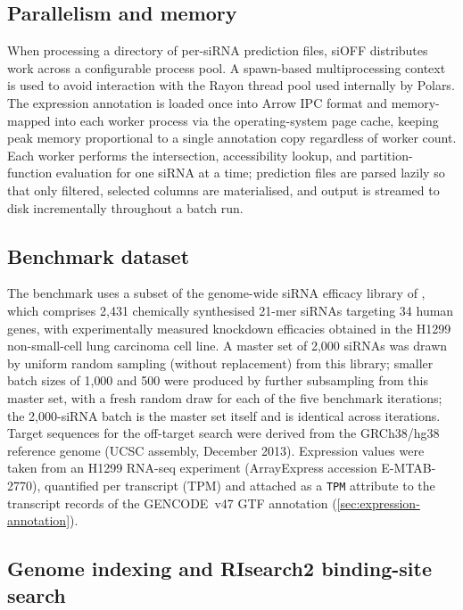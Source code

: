 \documentclass[11pt]{article}
\begin{document}
\subsection{Parallelism and memory}\label{sec:parallelism}

When processing a directory of per-siRNA prediction files, siOFF distributes work across a configurable process pool.
A spawn-based multiprocessing context is used to avoid interaction with the Rayon thread pool used internally by Polars.
The expression annotation is loaded once into Arrow IPC format and memory-mapped into each worker process via the operating-system page cache, keeping peak memory proportional to a single annotation copy regardless of worker count.
Each worker performs the intersection, accessibility lookup, and partition-function evaluation for one siRNA at a time; prediction files are parsed lazily so that only filtered, selected columns are materialised, and output is streamed to disk incrementally throughout a batch run.

\subsection{Benchmark dataset}\label{sec:benchmark-dataset}

The benchmark uses a subset of the genome-wide siRNA efficacy library of \citet{huesken2005design}, which comprises 2{,}431 chemically synthesised 21-mer siRNAs targeting 34 human genes, with experimentally measured knockdown efficacies obtained in the H1299 non-small-cell lung carcinoma cell line.
A master set of 2{,}000 siRNAs was drawn by uniform random sampling (without replacement) from this library; smaller batch sizes of 1{,}000 and 500 were produced by further subsampling from this master set, with a fresh random draw for each of the five benchmark iterations; the 2{,}000-siRNA batch is the master set itself and is identical across iterations.
Target sequences for the off-target search were derived from the GRCh38/hg38 reference genome (UCSC assembly, December 2013).
Expression values were taken from an H1299 RNA-seq experiment (ArrayExpress accession E-MTAB-2770), quantified per transcript (TPM) and attached as a \texttt{TPM} attribute to the transcript records of the GENCODE~v47 GTF annotation (\cref{sec:expression-annotation}).

\subsection{Genome indexing and RIsearch2 binding-site search}\label{sec:genome-indexing}
\end{document}
